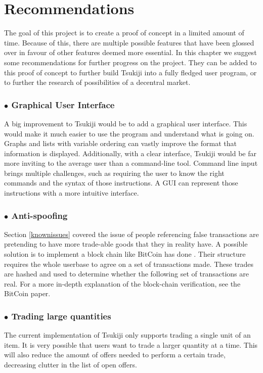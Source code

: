 \section{Recommendations}
\label{recommendations}
The goal of this project is to create a proof of concept in a limited amount of time.
Because of this, there are multiple possible features that have been glossed over in favour of other features deemed more essential.
In this chapter we suggest some recommendations for further progress on the project.
They can be added to this proof of concept to further build Tsukiji into a fully fledged user program, or to further the research of possibilities of a decentral market.

\subsubsection*{$\bullet$ Graphical User Interface}
A big improvement to Tsukiji would be to add a graphical user interface. 
This would make it much easier to use the program and understand what is going on.
Graphs and lists with variable ordering can vastly improve the format that information is displayed.
Additionally, with a clear interface, Tsukiji would be far more inviting to the average user than a command-line tool.
Command line input brings multiple challenges, such as requiring the user to know the right commands and the syntax of those instructions.
A GUI can represent those instructions with a more intuitive interface.

\subsubsection*{$\bullet$ Anti-spoofing}
Section \ref{knownissues} covered the issue of people referencing false transactions are pretending to have more trade-able goods that they in reality have.
A possible solution is to implement a block chain like BitCoin has done \cite{bitcoin}.
Their structure requires the whole userbase to agree on a set of transactions made.
These trades are hashed and used to determine whether the following set of transactions are real.
For a more in-depth explanation of the block-chain verification, see the BitCoin paper.

\subsubsection*{$\bullet$ Trading large quantities}
The current implementation of Tsukiji only supports trading a single unit of an item.
It is very possible that users want to trade a larger quantity at a time.
This will also reduce the amount of offers needed to perform a certain trade, decreasing clutter in the list of open offers.

